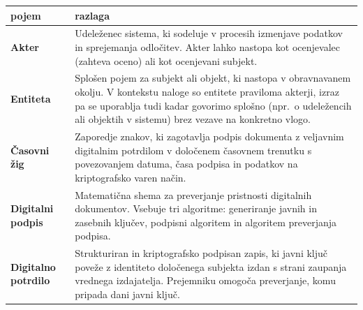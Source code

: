 \begin{table}[ht]
  \centering
  \small
  \setlength{\tabcolsep}{6pt} %
  \begin{tabularx}{1\textwidth} { 
  >{\raggedright\arraybackslash}p{}|
  >{\raggedright\arraybackslash}X}
    \textbf{pojem} & \textbf{razlaga} \\ \hline \hline
    \textbf{Akter} &
    Udeleženec sistema, ki sodeluje v procesih izmenjave podatkov in sprejemanja odločitev. Akter lahko nastopa kot ocenjevalec (zahteva oceno) ali kot ocenjevani subjekt. \\ \hline
    \textbf{Entiteta} &
    Splošen pojem za subjekt ali objekt, ki nastopa v obravnavanem okolju. V kontekstu naloge so entitete praviloma akterji, izraz pa se uporablja tudi kadar govorimo splošno (npr.\ o udeležencih ali objektih v sistemu) brez vezave na konkretno vlogo. \\ \hline
    \textbf{Časovni žig}   & Zaporedje znakov, ki zagotavlja podpis dokumenta z veljavnim digitalnim potrdilom v določenem časovnem trenutku s povezovanjem datuma, časa podpisa in podatkov na kriptografsko varen način. \\ \hline
    \textbf{Digitalni podpis} &
    Matematična shema za preverjanje pristnosti digitalnih dokumentov. Vsebuje tri algoritme: generiranje javnih in zasebnih ključev, podpisni algoritem in algoritem preverjanja podpisa. \\ \hline
    \textbf{Digitalno potrdilo} &
    Strukturiran in kriptografsko podpisan zapis, ki javni ključ poveže z identiteto določenega subjekta izdan s strani zaupanja vrednega izdajatelja. Prejemniku omogoča preverjanje, komu pripada dani javni ključ. \\

  \end{tabularx}
\end{table}

